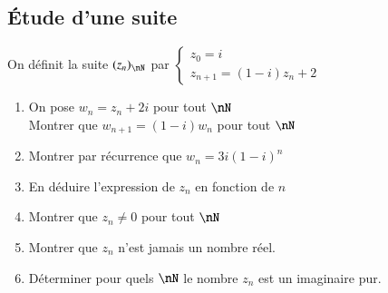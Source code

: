 \documentclass[oneside,12pt]{article}          %
\begin{document}
\subsection{Étude d'une suite}

On définit la suite $(z_n)_{\nN}$ par $\begin{cases}z_0=i\\z_{n+1}=(1-i)z_n+2\end{cases}$
\begin{enumerate}
    \item On pose $w_n=z_n+2i$ pour tout $\nN$ \\
    Montrer que $w_{n+1}=(1-i)w_n$ pour tout $\nN$
    \item Montrer par récurrence que $w_n=3i(1-i)^n$
    \item En déduire l'expression de $z_n$ en fonction de $n$
    \item Montrer que $z_n\neq0$ pour tout $\nN$
    \item Montrer que $z_n$ n'est jamais un nombre réel.
    \item Déterminer pour quels $\nN$ le nombre $z_n$ est un imaginaire pur.
\end{enumerate}
\end{document}
